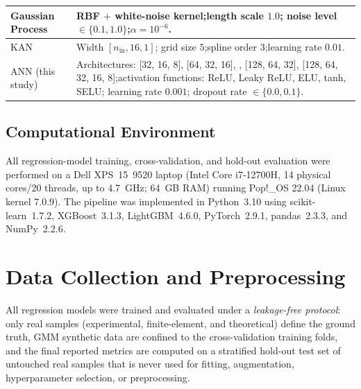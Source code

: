 \documentclass[journal,article,submit,pdftex,moreauthors]{Definitions/mdpi}
\begin{document}
\begin{table}[h]
\begin{tabular}{@{}l p{}@{}}
Gaussian Process & RBF $+$ white-noise kernel;\newline length scale $1.0$; \newline noise level $\in \{0.1, 1.0\}$;\newline $\alpha = 10^{-6}$. \\ \hline
KAN & Width $[n_\mathrm{in}, 16, 1]$; grid size $5$;\newline spline order $3$;\newline learning rate $0.01$. \\ \hline 
ANN (this study) & Architectures: [32, 16, 8], [64, 32, 16], \newline [64, 32, 16, 8], [128, 64, 32], [128, 64, 32, 16, 8];\newline  activation functions: ReLU, Leaky ReLU, ELU, tanh, SELU; \newline learning rate $0.001$; dropout rate $\in \{0.0, 0.1\}$. \\
\hline
\end{tabular}
\end{table}

\subsection{Computational Environment}
All regression-model training, cross-validation, and hold-out evaluation were performed on a Dell XPS~15~9520 laptop (Intel Core i7-12700H, 14 physical cores/20 threads, up to 4.7~GHz; 64~GB RAM) running Pop!\_OS 22.04 (Linux kernel 7.0.9). The pipeline was implemented in Python~3.10 using scikit-learn~1.7.2, XGBoost~3.1.3, LightGBM~4.6.0, PyTorch~2.9.1, pandas~2.3.3, and NumPy~2.2.6. 


\section{Data Collection and Preprocessing}\label{sec:data-preprocessing}
All regression models were trained and evaluated under a \textit{leakage-free protocol}: only real samples (experimental, finite-element, and theoretical) define the ground truth, GMM synthetic data are confined to the cross-validation training folds, and the final reported metrics are computed on a stratified hold-out test set of untouched real samples that is never used for fitting, augmentation, hyperparameter selection, or preprocessing.
\end{document}
